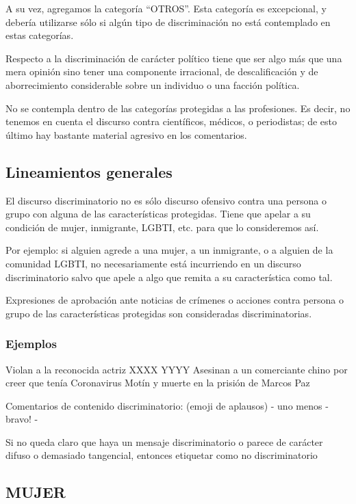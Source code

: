 A su vez, agregamos la categoría “OTROS”. Esta categoría es excepcional, y debería utilizarse sólo si algún tipo de discriminación no está contemplado en estas categorías. 

Respecto a la discriminación de carácter político tiene que ser algo más que una mera opinión  sino tener una componente irracional, de descalificación y de aborrecimiento considerable sobre un individuo o una facción política.

No se contempla dentro de las categorías protegidas a las profesiones. Es decir, no tenemos en cuenta el discurso contra científicos, médicos, o periodistas; de esto último hay bastante material agresivo en los comentarios.


\subsection{Lineamientos generales}

El discurso discriminatorio no es sólo discurso ofensivo contra una persona o grupo con alguna de las características protegidas. Tiene que apelar a su condición de mujer, inmigrante, LGBTI, etc. para que lo consideremos así.

Por ejemplo: si alguien agrede a una mujer, a un inmigrante, o a alguien de la comunidad LGBTI, no necesariamente está incurriendo en un discurso discriminatorio salvo que apele a algo que remita a su característica como tal.


Expresiones de aprobación ante noticias de crímenes o acciones contra persona o grupo de las características protegidas son consideradas discriminatorias.

\subsubsection{Ejemplos}

Violan a la reconocida actriz XXXX YYYY
Asesinan a un comerciante chino por creer que tenía Coronavirus
Motín y muerte en la prisión de Marcos Paz

Comentarios de contenido discriminatorio: (emoji de aplausos) - uno menos - bravo! -    


Si no queda claro que haya un mensaje discriminatorio o parece de carácter difuso o demasiado tangencial, entonces etiquetar como no discriminatorio




\subsection{MUJER}

